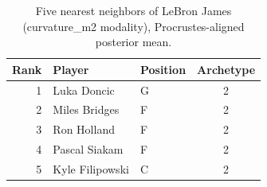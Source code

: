 \begin{table}[htbp]
  \centering\small
  \begin{tabular}{rllc}
    \toprule
    Rank & Player & Position & Archetype \\
    \midrule
    1 & Luka Doncic & G & 2 \\
    2 & Miles Bridges & F & 2 \\
    3 & Ron Holland & F & 2 \\
    4 & Pascal Siakam & F & 2 \\
    5 & Kyle Filipowski & C & 2 \\
    \bottomrule
  \end{tabular}
  \caption{Five nearest neighbors of LeBron James (curvature_m2 modality), Procrustes-aligned posterior mean.}
  \label{tab:LeBron_James_neighbors_curvature_m2}
\end{table}

